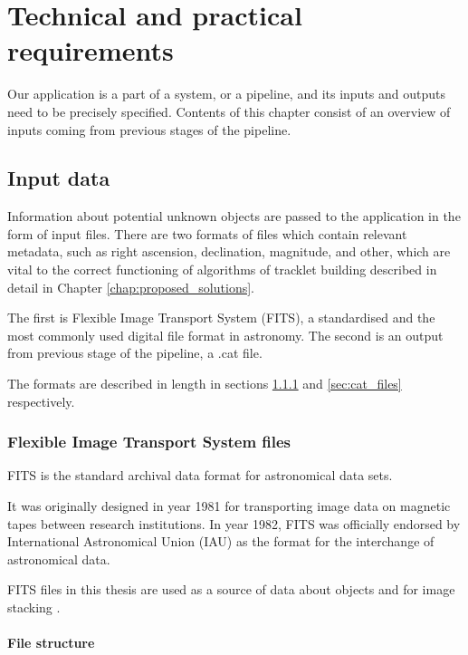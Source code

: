 \chapter{Technical and practical requirements}\label{chap:requirements}

	Our application is a part of a system, or a pipeline, and its inputs and outputs need to be precisely specified. Contents of this chapter consist of an overview of inputs coming from previous stages of the pipeline.

\section{Input data}\label{sec:input_data}

	Information about potential unknown objects are passed to the application in the form of input files. There are two formats of files which contain relevant metadata, such as right ascension, declination, magnitude, and other, which are vital to the correct functioning of algorithms of tracklet building described in detail in Chapter \ref{chap:proposed_solutions}. 
	
	The first is Flexible Image Transport System (FITS), a standardised and the most commonly used digital file format in astronomy. The second is an output from previous stage of the pipeline, a .cat file. 
	
	The formats are described in length in sections \ref{sec:fits_files} and \ref{sec:cat_files} respectively.
	
\subsection{Flexible Image Transport System files}\label{sec:fits_files}
	
	FITS is the standard archival data format for astronomical data sets. 
	
	It was originally designed in year 1981 for transporting image data on magnetic tapes between research institutions. In year 1982, FITS was officially endorsed by International Astronomical Union (IAU) as the format for the interchange of astronomical data.
	
	FITS files in this thesis are used as a source of data about objects and for image stacking \citep{FITSdefinition}.
	
\subsubsection{File structure}

